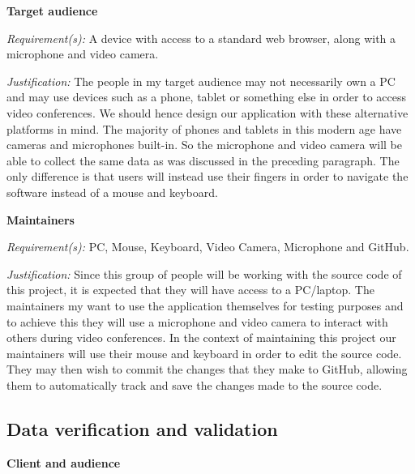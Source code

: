 \textsf{\bfseries Target audience} \\ \vspace{0.1cm}

\textit{Requirement(s):} A device with access to a standard web browser, 
along with a microphone and video camera.
\\ \vspace{0.1cm}

\textit{Justification:}
The people in my target audience may not necessarily 
own a PC and may use devices such as a phone, tablet 
or something else in order to access video conferences.
We should hence design our application with these 
alternative platforms in mind. The majority of phones 
and tablets in this modern age have cameras and 
microphones built-in. So the microphone and video camera
will be able to collect the same data as was discussed 
in the preceding paragraph. The only difference is that
users will instead use their fingers in order to navigate
the software instead of a mouse and keyboard.
\\ \vspace{0.2cm}

\textsf{\bfseries Maintainers} \\ \vspace{0.1cm}

\textit{Requirement(s):} PC, Mouse, Keyboard, Video Camera, Microphone and GitHub.
\\ \vspace{0.1cm}

\textit{Justification:}
Since this group of people will be working with the source
code of this project, it is expected that they will have 
access to a PC/laptop. The maintainers my want to use the 
application themselves for testing purposes and to achieve 
this they will use a microphone and video camera to interact 
with others during video conferences. In the context of 
maintaining this project our maintainers will use their 
mouse and keyboard in order to edit the source code. They 
may then wish to commit the changes that they make to 
GitHub, allowing them to automatically track and save the 
changes made to the source code.

\subsection{Data verification and validation}

\textsf{\bfseries Client and audience} \\ \vspace{0.1cm}

